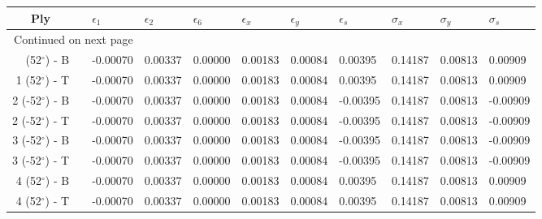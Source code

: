 \begin{table}[H]
\caption{Stresses are in [GPa].}
\begin{longtable}{@{}rllllllllll@{}}
\toprule
                 \multicolumn{1}{c}{Ply} &\phantom{a}&  $\epsilon_1$ &  $\epsilon_2$ &  $\epsilon_6$ &  $\epsilon_x$ &  $\epsilon_y$ &  $\epsilon_s$ &  $\sigma_x$ &  $\sigma_y$ &  $\sigma_s$ \\
\midrule
\endhead
\midrule
\multicolumn{3}{r}{{Continued on next page}} \\
\midrule
\endfoot

\bottomrule
\endlastfoot
  1 (52$^\circ$) - B &&      -0.00070 &       0.00337 &       0.00000 &       0.00183 &       0.00084 &       0.00395 &     0.14187 &     0.00813 &     0.00909 \\
  1 (52$^\circ$) - T &&      -0.00070 &       0.00337 &       0.00000 &       0.00183 &       0.00084 &       0.00395 &     0.14187 &     0.00813 &     0.00909 \\\midrule
 2 (-52$^\circ$) - B &&      -0.00070 &       0.00337 &       0.00000 &       0.00183 &       0.00084 &      -0.00395 &     0.14187 &     0.00813 &    -0.00909 \\
 2 (-52$^\circ$) - T &&      -0.00070 &       0.00337 &       0.00000 &       0.00183 &       0.00084 &      -0.00395 &     0.14187 &     0.00813 &    -0.00909 \\\midrule
 3 (-52$^\circ$) - B &&      -0.00070 &       0.00337 &       0.00000 &       0.00183 &       0.00084 &      -0.00395 &     0.14187 &     0.00813 &    -0.00909 \\
 3 (-52$^\circ$) - T &&      -0.00070 &       0.00337 &       0.00000 &       0.00183 &       0.00084 &      -0.00395 &     0.14187 &     0.00813 &    -0.00909 \\\midrule
  4 (52$^\circ$) - B &&      -0.00070 &       0.00337 &       0.00000 &       0.00183 &       0.00084 &       0.00395 &     0.14187 &     0.00813 &     0.00909 \\
  4 (52$^\circ$) - T &&      -0.00070 &       0.00337 &       0.00000 &       0.00183 &       0.00084 &       0.00395 &     0.14187 &     0.00813 &     0.00909 \\\midrule
\end{longtable}
\end{table}